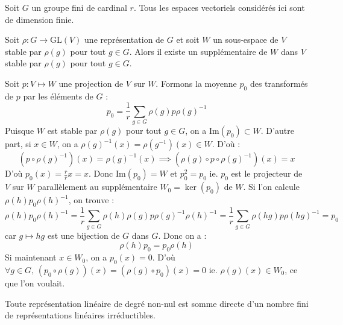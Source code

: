 



	

	Soit $G$ un groupe fini de cardinal $r$. Tous les espaces vectoriels considérés ici sont de dimension finie.
	
	\medskip
	
	\begin{lemma}
		\label{theoreme-de-maschke-1}
		Soit $\rho : G \rightarrow \mathrm{GL}(V)$ une représentation de $G$ et soit $W$ un sous-espace de $V$ stable par $\rho(g)$ pour tout $g \in G$. Alors il existe un supplémentaire de $W$ dans $V$ stable par $\rho(g)$ pour tout $g \in G$.
	\end{lemma}
	
	\begin{demonstration}
		Soit $p : V \mapsto W$ une projection de $V$ sur $W$. Formons la moyenne $p_0$ des transformés de $p$ par les éléments de $G$ :
		\[ p_0 = \frac{1}{r} \sum_{g \in G} \rho(g) p \rho(g)^{-1} \]
		Puisque $W$ est stable par $\rho(g)$ pour tout $g \in G$, on a $\mathrm{Im}(p_0) \subset W$.
		\newpar
		D'autre part, si $x \in W$, on a $\rho(g)^{-1}(x) = \rho(g^{-1})(x) \in W$. D'où :
		\[ (p \circ \rho(g)^{-1})(x) = \rho(g)^{-1}(x) \implies (\rho(g) \circ p \circ \rho(g)^{-1})(x) = x \]
		D'où $p_0(x) = \frac{r}{r} x = x$. Donc $\mathrm{Im}(p_0) = W$ et $p_0^2 = p_0$ ie. $p_0$ est le projecteur de $V$ sur $W$ parallèlement au supplémentaire $W_0 = \ker{(p_0)}$ de $W$.
		\newpar
		Si l'on calcule $\rho(h) p_0 \rho(h)^{-1}$, on trouve :
		\[ \rho(h) p_0 \rho(h)^{-1} = \frac{1}{r} \sum_{g \in G} \rho(h) \rho(g) p \rho(g)^{-1} \rho(h)^{-1} = \frac{1}{r} \sum_{g \in G} \rho(hg) p \rho(hg)^{-1} = p_0 \]
		car $g \mapsto hg$ est une bijection de $G$ dans $G$. Donc on a :
		\[ \rho(h) p_0 = p_0 \rho(h) \]
		Si maintenant $x \in W_0$, on a $p_0(x) = 0$. D'où $\forall g \in G, \, (p_0 \circ \rho(g))(x) = (\rho(g) \circ p_0)(x) = 0$ ie. $\rho(g)(x) \in W_0$, ce que l'on voulait.
	\end{demonstration}
	
	\begin{theorem}[Maschke]
		Toute représentation linéaire de degré non-nul est somme directe d'un nombre fini de représentations linéaires irréductibles.
	\end{theorem}
	
